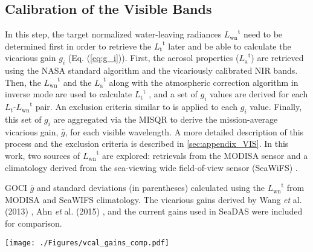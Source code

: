 \documentclass[]{interact}
\theoremstyle{plain}%
\theoremstyle{definition}
\theoremstyle{remark}
\begin{document}
\subsection{Calibration of the Visible Bands}
\label{sec:vcal_vis}
In this step, the target normalized water-leaving radiances ${L_\text{wn}}^\text{t}$ need to be determined first in order to retrieve the  ${L_\text{t}}^\text{t}$ later and be able to calculate the vicarious gain $g_i$ (Eq. (\ref{eq:g_i})). First, the aerosol properties (${L_\text{a}}^\text{t}$) are retrieved using the NASA standard algorithm \citep{Mobley2016} and the vicariously calibrated NIR bands. Then, the ${L_\text{wn}}^\text{t}$ and the ${L_\text{a}}^\text{t}$ along with the atmospheric correction algorithm in inverse mode are used to calculate ${L_\text{t}}^\text{t}$ \citep{Franz:07}, and a set of $g_i$ values are derived for each $L_t$-${L_\text{wn}}^\text{t}$ pair. An exclusion criteria similar to \citep{Bailey2006} is applied to each $g_i$ value. Finally, this set of $g_i$ are aggregated via the MISQR to derive the mission-average vicarious gain, $\bar{g}$, for each visible wavelength. A more detailed description of this process and the exclusion criteria is described in \autoref{sec:appendix_VIS}. In this work, two sources of ${L_\text{wn}}^\text{t}$ are explored: retrievals from the MODISA sensor and a climatology derived from the sea-viewing wide field-of-view sensor (SeaWiFS) \citep{McClain2004}. 

\begin{table}[htbp!]
\caption{GOCI $\bar{g}$ and standard deviations (in parentheses) calculated using the ${L_\text{wn}}^\text{t}$ from MODISA and SeaWIFS climatology. The vicarious gains derived by Wang {\it et} al. (2013) \citep{Wang:13}, Ahn {\it et} al. (2015) \citep{Ahn2015}, and the current gains used in SeaDAS were included for comparison. \label{tab:vcal_gains_comp}}

  \centering
    \texttt{[image: ./Figures/vcal\_gains\_comp.pdf]}

\end{table}
\end{document}
